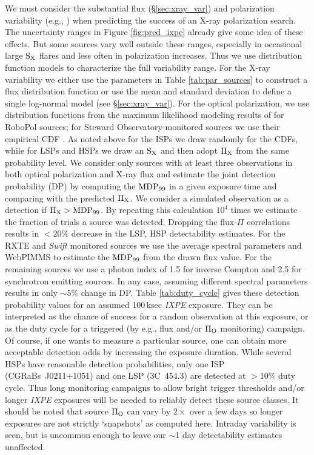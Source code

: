We must consider the substantial flux (\S \ref{sec:xray_var}) and polarization variability (e.g., \citealp{angelakis_robopol:_2016,kiehlmann_optical_2017}) when predicting the success of an X-ray polarization search. The uncertainty ranges in Figure \ref{fig:pred_ixpe} already give
some idea of these effects. But some sources vary well outside these ranges, especially
in occasional large $\rm S_X$ flares and less often in polarization increases. Thus we use
distribution function models to characterize the full variability range. For the X-ray variability we either use the parameters in Table \ref{tab:par_sources} to construct a flux distribution function or use the mean and standard deviation to define a single log-normal model (see \S \ref{sec:xray_var}). For the optical polarization, we use distribution 
functions from the maximum likelihood modeling results of \cite{angelakis_robopol:_2016} for RoboPol sources; for Steward Observatory-monitored sources we use their empirical CDF \citep{smith_coordinated_2009}. As noted above for the ISPs we draw randomly for the CDFs, while for LSPs and HSPs we draw an $\rm S_X$ and then adopt $\rm \Pi_X$ from the same probability level.  We consider only sources with at least three observations in both optical polarization and X-ray 
flux and estimate the joint detection probability (DP) by computing the $\rm MDP_{99}$ in a given exposure time and comparing with the predicted $\rm \Pi_X$. We consider
a simulated observation as a detection if $\rm \Pi_X > MDP_{99}$. By repeating this 
calculation $10^4$ times we estimate the fraction of trials a source was detected. 
Dropping the flux-$\Pi$ correlations results in $<20\%$ decrease in the LSP, HSP 
detectability estimates. For the RXTE and {\it Swift} monitored sources we use the average spectral parameters and WebPIMMS to estimate the $\rm MDP_{99}$ from the drawn flux value. For the remaining sources we use a photon index of 1.5 for inverse Compton and 2.5 for synchrotron emitting sources. In any case, assuming different spectral parameters results in only $\sim 5\%$ change in DP. Table \ref{tab:duty_cycle} gives these detection probability values for an assumed 100\,ksec {\it IXPE} exposure. They can be interpreted as the chance of success for a random observation at this exposure, or as the duty cycle for a triggered (by e.g., flux and/or $\rm \Pi_O$ monitoring) campaign. Of course, if one wants to measure a particular source, one can obtain more acceptable detection odds by increasing the exposure duration. While several HSPs have reasonable detection probabilities, only one ISP (CGRaBs~J0211+1051) and one LSP (3C~454.3) are detected at $>$10\% duty cycle. Thus long monitoring campaigns to allow bright trigger thresholds and/or longer {\it IXPE} exposures will be needed to reliably detect these source classes. It should be noted that source $\rm \Pi_O$ can vary by $2\times$ over a few days so longer exposures are not strictly `snapshots' as computed here. Intraday variability is seen, but is uncommon enough to leave our $\sim$1 day detectability estimates unaffected.

